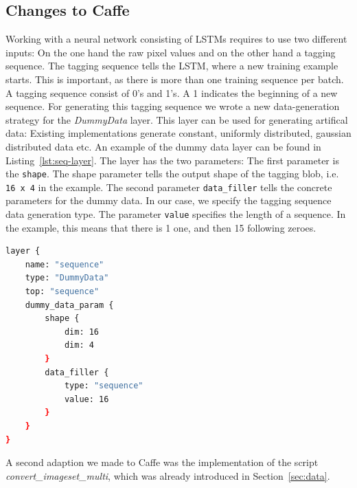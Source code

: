 \subsection{Changes to Caffe}

Working with a neural network consisting of LSTMs requires to use two different inputs:
On the one hand the raw pixel values and on the other hand a tagging sequence.
The tagging sequence tells the LSTM, where a new training example starts.
This is important, as there is more than one training sequence per batch.
A tagging sequence consist of 0's and 1's.
A 1 indicates the beginning of a new sequence.
For generating this tagging sequence we wrote a new data-generation strategy for the \emph{DummyData} layer.
This layer can be used for generating artifical data: Existing implementations generate constant, uniformly distributed, gaussian distributed data etc.
An example of the dummy data layer can be found in Listing~\ref{lst:seq-layer}.
The layer has the two parameters:
The first parameter is the \texttt{shape}.
The shape parameter tells the output shape of the tagging blob, i.e. \texttt{16 x 4} in the example.
The second parameter \texttt{data\_filler} tells the concrete parameters for the dummy data.
In our case, we specify the tagging sequence data generation type.
The parameter \texttt{value} specifies the length of a sequence.
In the example, this means that there is 1 one, and then 15 following zeroes.

\begin{lstlisting}[language=sh, caption=Sequence Layer, label=lst:seq-layer]
layer {
	name: "sequence"
	type: "DummyData"
	top: "sequence"
	dummy_data_param {
		shape {
			dim: 16
			dim: 4
		}
		data_filler {
			type: "sequence"
			value: 16
		}
	}
}
\end{lstlisting}

A second adaption we made to Caffe was the implementation of the script \emph{convert\_imageset\_multi}, which was already introduced in Section~\ref{sec:data}.


